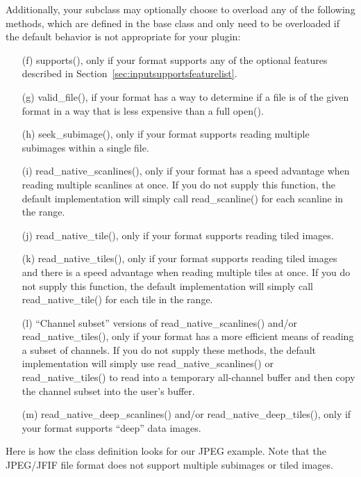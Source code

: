 \begin{enumerate}
  Additionally, your \ImageInput subclass may optionally choose to
  overload any of the following methods, which are defined in the
  \ImageInput base class and only need to be overloaded if the default
  behavior is not appropriate for your plugin:

  \begin{enumerate}
    \item[(f)] {\cf supports()}, only if your format supports any of
      the optional features described in
      Section~\ref{sec:inputsupportsfeaturelist}.
    \item[(g)] {\cf valid_file()}, if your format has a way to
      determine if a file is of the given format in a way that is less
      expensive than a full {\cf open()}.
    \item[(h)] {\cf seek_subimage()}, only if your format supports
      reading multiple subimages within a single file.
    \item[(i)] {\cf read_native_scanlines()}, only if your format has a speed
      advantage when reading multiple scanlines at once.  If you do not
      supply this function, the default implementation will simply call
      {\cf read_scanline()} for each scanline in the range.
    \item[(j)] {\cf read_native_tile()}, only if your format supports
      reading tiled images.
    \item[(k)] {\cf read_native_tiles()}, only if your format supports
      reading tiled images and there is a speed advantage when reading
      multiple tiles at once.  If you do not supply this function, the
      default implementation will simply call {\cf read_native_tile()} for each
      tile in the range.
    \item[(l)] ``Channel subset'' versions of {\cf read_native_scanlines()}
      and/or {\cf read_native_tiles()}, only if your format has a more
      efficient means of reading a subset of channels.  If you do not
      supply these methods, the default implementation will simply use
      {\cf read_native_scanlines()} or {\cf read_native_tiles()} to read
      into a temporary all-channel buffer and then copy the channel
      subset into the user's buffer.
    \item[(m)] {\cf read_native_deep_scanlines()} and/or 
      {\cf read_native_deep_tiles()}, only if your format supports
      ``deep'' data images.
  \end{enumerate}

  Here is how the class definition looks for our JPEG example.  Note
  that the JPEG/JFIF file format does not support multiple subimages
  or tiled images.


\end{enumerate}
